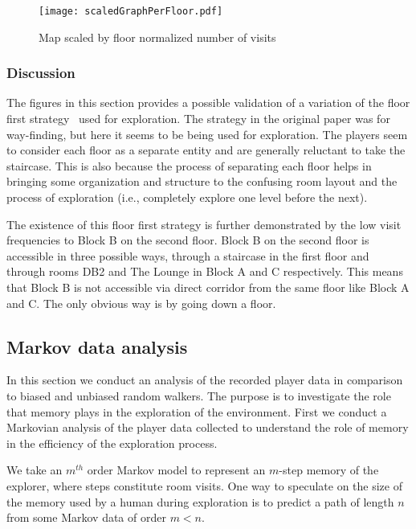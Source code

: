 \begin{figure*}[!htb]
\centering
\texttt{[image: scaledGraphPerFloor.pdf]}
\caption{Map scaled by floor normalized number of visits}
\label{fig:scaledGraphByFloor}
\end{figure*}




\subsubsection{Discussion}

The figures in this section provides a possible validation of a variation of the floor first strategy~\cite{HolscherBMS06} used for exploration. The strategy in the original paper was for way-finding, but here it seems to be being used for exploration. The players seem to consider each floor as a separate entity and are generally reluctant to take the staircase. This is also because the process of separating each floor helps in bringing some organization and structure to the confusing room layout and the process of exploration (i.e., completely explore one level before the next).

The existence of this floor first strategy is further demonstrated by the low visit frequencies to Block B on the second floor. Block B on the second floor is accessible in three possible ways, through a staircase in the first floor and through rooms DB2 and The Lounge in Block A and C respectively. This means that Block B is not accessible via direct corridor from the same floor like Block A and C. The only obvious way is by going down a floor.



\subsection{Markov data analysis}
\label{sec:Markov_data_analysis}


In this section we conduct an analysis of the recorded player data in comparison to biased and unbiased random walkers. The purpose is to investigate the role that memory plays in the exploration of the environment. First we conduct a Markovian analysis of the player data collected to understand the role of memory in the efficiency of the exploration process.

We take an $m^{th}$ order Markov model to represent an $m$-step memory of the explorer, where steps constitute room visits. One way to speculate on the size of the memory used by a human during exploration is to predict a path of length $n$ from some Markov data of order $m < n$.

